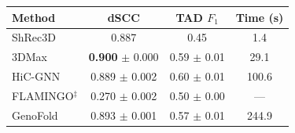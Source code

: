 \renewcommand{\arraystretch}{1.2}
\setlength{\tabcolsep}{4pt}
\begin{tabular}{@{}lccc@{}}
\toprule
\textbf{Method} & \textbf{dSCC} & \textbf{TAD $F_1$} & \textbf{Time (s)} \\
\midrule
ShRec3D & 0.887 & 0.45 & 1.4 \\
3DMax & \textbf{0.900} $\pm$ 0.000 & 0.59 $\pm$ 0.01 & 29.1 \\
HiC-GNN & 0.889 $\pm$ 0.002 & 0.60 $\pm$ 0.01 & 100.6 \\
FLAMINGO$^\ddagger$ & 0.270 $\pm$ 0.002 & 0.50 $\pm$ 0.00 & --- \\
GenoFold & 0.893 $\pm$ 0.001 & 0.57 $\pm$ 0.01 & 244.9 \\
\bottomrule
\end{tabular}
